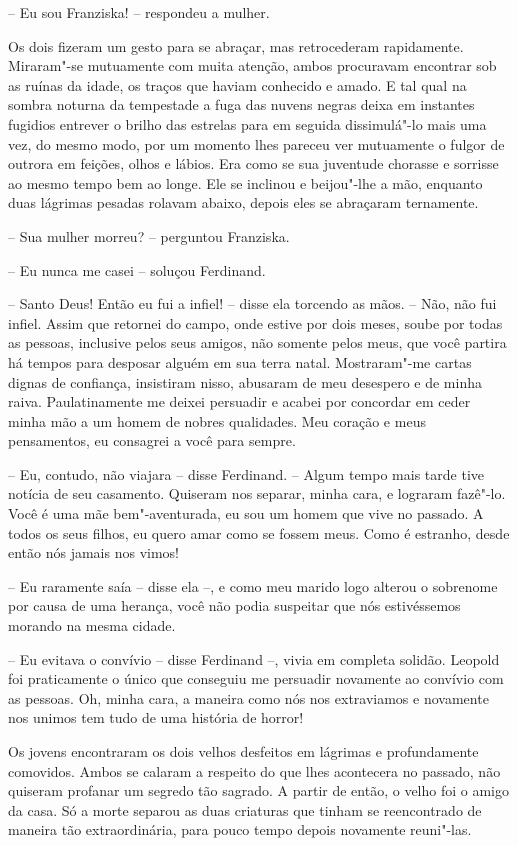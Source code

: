 -- Eu sou Franziska! -- respondeu a mulher.

Os dois fizeram um gesto para se abraçar, mas retrocederam rapidamente.
Miraram"-se mutuamente com muita atenção, ambos procuravam encontrar sob
as ruínas da idade, os traços que haviam conhecido e amado. E tal qual
na sombra noturna da tempestade a fuga das nuvens negras deixa em
instantes fugidios entrever o brilho das estrelas para em seguida
dissimulá"-lo mais uma vez, do mesmo modo, por um momento lhes pareceu
ver mutuamente o fulgor de outrora em feições, olhos e lábios. Era como
se sua juventude chorasse e sorrisse ao mesmo tempo bem ao longe. Ele
se inclinou e beijou"-lhe a mão, enquanto duas lágrimas pesadas rolavam
abaixo, depois eles se abraçaram ternamente. 

-- Sua mulher morreu? -- perguntou Franziska.

-- Eu nunca me casei -- soluçou Ferdinand. 

-- Santo Deus! Então eu fui a infiel! -- disse ela torcendo as mãos.
 -- Não, não fui infiel. Assim que retornei do campo, onde estive por dois
meses, soube por todas as pessoas, inclusive pelos seus amigos, não
somente pelos meus, que você partira há tempos para desposar alguém em
sua terra natal. Mostraram"-me cartas dignas de confiança, insistiram
nisso, abusaram de meu desespero e de minha raiva. Paulatinamente me
deixei persuadir e acabei por concordar em ceder minha mão a um homem
de nobres qualidades. Meu coração e meus pensamentos, eu consagrei a
você para sempre.

 -- Eu, contudo, não viajara -- disse Ferdinand. -- Algum tempo mais
tarde tive notícia de seu casamento. Quiseram nos separar, minha cara,
e lograram fazê"-lo. Você é uma mãe bem"-aventurada, eu sou um homem que
vive no passado. A todos os seus filhos, eu quero amar como se fossem
meus. Como é estranho, desde então nós jamais nos vimos!
 
-- Eu raramente saía -- disse ela --, e como meu marido logo alterou o
sobrenome por causa de uma herança, você não podia suspeitar que nós
estivéssemos morando na mesma cidade.

-- Eu evitava o convívio -- disse Ferdinand --, vivia em completa
solidão. Leopold foi praticamente o único que conseguiu me persuadir
novamente ao convívio com as pessoas. Oh, minha cara, a maneira como nós
nos extraviamos e novamente nos unimos tem tudo de uma história de horror!

Os jovens encontraram os dois velhos desfeitos em lágrimas e
profundamente comovidos. Ambos se calaram a respeito do que lhes
acontecera no passado, não quiseram profanar um segredo tão sagrado. A
partir de então, o velho foi o amigo da casa. Só a morte separou as
duas criaturas que tinham se reencontrado de maneira tão
extraordinária, para pouco tempo depois novamente reuni"-las.
\medskip

